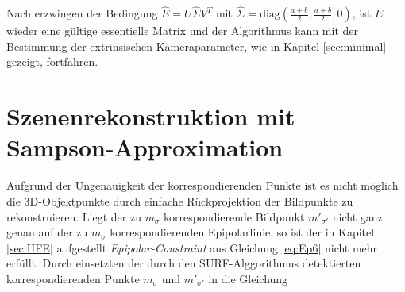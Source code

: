 Nach erzwingen der Bedingung $\hat{E} = U \hat{\Sigma}V^T$ mit $\hat{\Sigma} = \text{diag}(\frac{a+b}{2},\frac{a+b}{2},0)$, ist $E$ wieder eine gültige essentielle Matrix und der Algorithmus kann mit der Bestimmung der extrinsischen Kameraparameter, wie in Kapitel \ref{sec:minimal} gezeigt, fortfahren.



\section{Szenenrekonstruktion mit Sampson-Approximation}
\label{sec:sampson}

Aufgrund der Ungenauigkeit der korrespondierenden Punkte ist es nicht möglich die 3D-Objektpunkte durch einfache Rückprojektion der Bildpunkte zu rekonstruieren. Liegt der zu $m_\sigma$ korrespondierende Bildpunkt $m'_{\sigma'}$ nicht ganz genau auf der zu $m_\sigma$ korrespondierenden Epipolarlinie, so ist der in Kapitel \ref{sec:HFE} aufgestellt \textit{Epipolar-Constraint} aus Gleichung \ref{eq:Ep6} nicht mehr erfüllt. Durch einsetzten der durch den SURF-Alggorithmus detektierten korrespondierenden Punkte $m_\sigma$ und $m'_{\sigma'}$ in die Gleichung 

